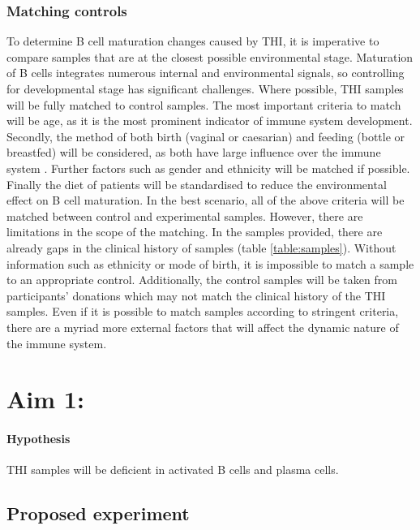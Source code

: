 \documentclass[12pt]{article}
\begin{document}
			\subsubsection{Matching controls} 
			
				To determine B cell maturation changes caused by THI, it is imperative to compare samples that are at the closest possible environmental stage.
				Maturation of B cells integrates numerous internal and environmental signals, so controlling for developmental stage has significant challenges. 
				Where possible, THI samples will be fully matched to control samples. 
				The most important criteria to match will be age, as it is the most prominent indicator of immune system development. 
				Secondly, the method of both birth (vaginal or caesarian) and feeding (bottle or breastfed) will be considered, as both have large influence over the immune system \citep{Jakobsson14,Cho13,Brandtzaeg03,Rogier14,Gomez14}.
				Further factors such as gender and ethnicity will be matched if possible. 
				Finally the diet of patients will be standardised to reduce the environmental effect on B cell maturation.
				In the best scenario, all of the above criteria will be matched between control and experimental samples. 
				However, there are limitations in the scope of the matching. 
				In the samples provided, there are already gaps in the clinical history of samples (table \ref{table:samples}). 
				Without information such as ethnicity or mode of birth, it is impossible to match a sample to an appropriate control. 
				Additionally, the control samples will be taken from participants' donations which may not match the clinical history of the THI samples.
				Even if it is possible to match samples according to stringent criteria, there are a myriad more external factors that will affect the dynamic nature of the immune system.
				 
	
	\section{Aim 1:}
	
		\paragraph{Hypothesis} THI samples will be deficient in activated B cells and plasma cells. 
		
		\subsection{Proposed experiment}
		
\end{document}
